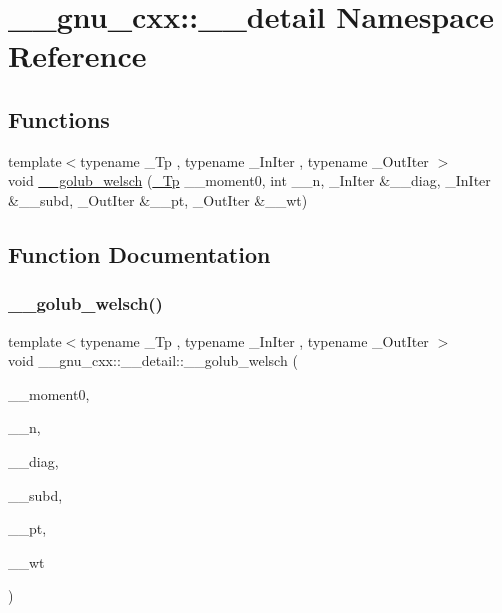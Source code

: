 \hypertarget{namespace____gnu__cxx_1_1____detail}{}\section{\+\_\+\+\_\+gnu\+\_\+cxx\+:\+:\+\_\+\+\_\+detail Namespace Reference}
\label{namespace____gnu__cxx_1_1____detail}
\subsection*{Functions}
\begin{DoxyCompactItemize}
\item 
{\footnotesize template$<$typename \+\_\+\+Tp , typename \+\_\+\+In\+Iter , typename \+\_\+\+Out\+Iter $>$ }\\void \hyperlink{namespace____gnu__cxx_1_1____detail_aa9f299bb7c04606a9a9aab3ab9e4f4c8}{\+\_\+\+\_\+golub\+\_\+welsch} (\hyperlink{namespace____gnu__cxx_a3b19a9c800ca194374ef9172290f7d79}{\+\_\+\+Tp} \+\_\+\+\_\+moment0, int \+\_\+\+\_\+n, \+\_\+\+In\+Iter \&\+\_\+\+\_\+diag, \+\_\+\+In\+Iter \&\+\_\+\+\_\+subd, \+\_\+\+Out\+Iter \&\+\_\+\+\_\+pt, \+\_\+\+Out\+Iter \&\+\_\+\+\_\+wt)
\end{DoxyCompactItemize}


\subsection{Function Documentation}
\mbox{\label{namespace____gnu__cxx_1_1____detail_aa9f299bb7c04606a9a9aab3ab9e4f4c8}} 
\subsubsection{\texorpdfstring{\+\_\+\+\_\+golub\+\_\+welsch()}{\_\_golub\_welsch()}}
{\footnotesize\ttfamily template$<$typename \+\_\+\+Tp , typename \+\_\+\+In\+Iter , typename \+\_\+\+Out\+Iter $>$ \\
void \+\_\+\+\_\+gnu\+\_\+cxx\+::\+\_\+\+\_\+detail\+::\+\_\+\+\_\+golub\+\_\+welsch (\begin{DoxyParamCaption}\item[{\hyperlink{namespace____gnu__cxx_a3b19a9c800ca194374ef9172290f7d79}{\+\_\+\+Tp}}]{\+\_\+\+\_\+moment0,  }\item[{int}]{\+\_\+\+\_\+n,  }\item[{\+\_\+\+In\+Iter \&}]{\+\_\+\+\_\+diag,  }\item[{\+\_\+\+In\+Iter \&}]{\+\_\+\+\_\+subd,  }\item[{\+\_\+\+Out\+Iter \&}]{\+\_\+\+\_\+pt,  }\item[{\+\_\+\+Out\+Iter \&}]{\+\_\+\+\_\+wt }\end{DoxyParamCaption})}


